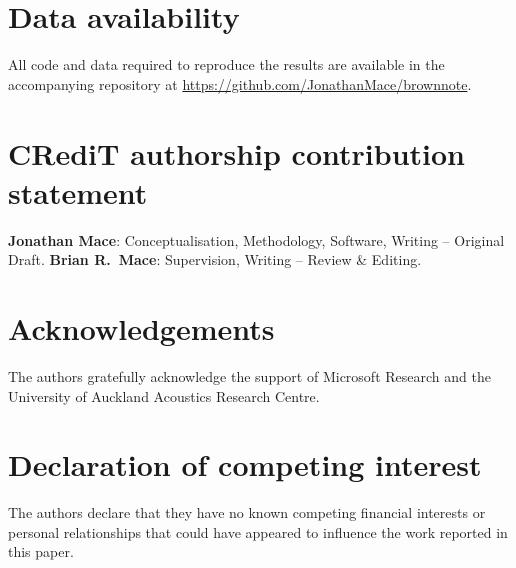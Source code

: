 \documentclass[review]{elsarticle}
\begin{document}
\graphicspath{{../figures/}}


















\section*{Data availability}
All code and data required to reproduce the results are available in the
accompanying repository at \url{https://github.com/JonathanMace/brownnote}.

\section*{CRediT authorship contribution statement}
\textbf{Jonathan Mace}: Conceptualisation, Methodology, Software,
Writing -- Original Draft.
\textbf{Brian R.\ Mace}: Supervision, Writing -- Review \& Editing.

\section*{Acknowledgements}
The authors gratefully acknowledge the support of Microsoft Research
and the University of Auckland Acoustics Research Centre.

\section*{Declaration of competing interest}
The authors declare that they have no known competing financial interests
or personal relationships that could have appeared to influence the work
reported in this paper.
\end{document}
